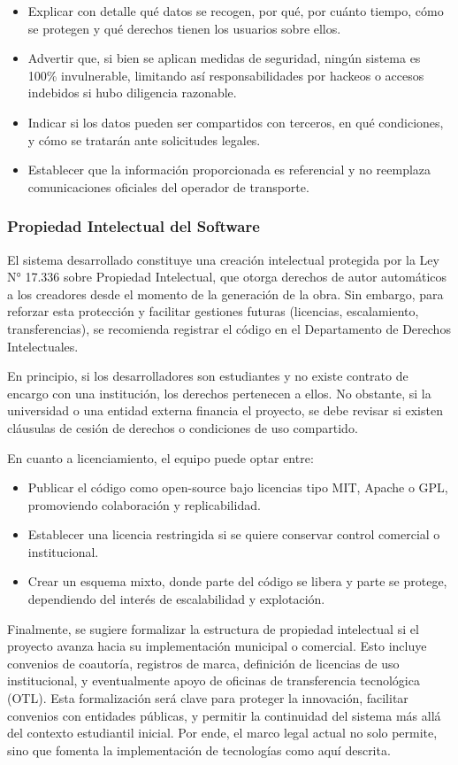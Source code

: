 \documentclass[12pt]{article}
\begin{document}
\begin{itemize}
    \item Explicar con detalle qué datos se recogen, por qué, por cuánto tiempo, cómo se protegen y qué derechos tienen los usuarios sobre ellos.
    \item Advertir que, si bien se aplican medidas de seguridad, ningún sistema es 100\% invulnerable, limitando así responsabilidades por hackeos o accesos indebidos si hubo diligencia razonable.
    \item Indicar si los datos pueden ser compartidos con terceros, en qué condiciones, y cómo se tratarán ante solicitudes legales.
    \item Establecer que la información proporcionada es referencial y no reemplaza comunicaciones oficiales del operador de transporte.\\ 


\end{itemize}
\subsubsection{Propiedad Intelectual del Software}

El sistema desarrollado constituye una creación intelectual protegida por la Ley N° 17.336 sobre Propiedad Intelectual, que otorga derechos de autor automáticos a los creadores desde el momento de la generación de la obra. Sin embargo, para reforzar esta protección y facilitar gestiones futuras (licencias, escalamiento, transferencias), se recomienda registrar el código en el Departamento de Derechos Intelectuales.

En principio, si los desarrolladores son estudiantes y no existe contrato de encargo con una institución, los derechos pertenecen a ellos. No obstante, si la universidad o una entidad externa financia el proyecto, se debe revisar si existen cláusulas de cesión de derechos o condiciones de uso compartido.

En cuanto a licenciamiento, el equipo puede optar entre:

\begin{itemize}
    \item Publicar el código como open-source bajo licencias tipo MIT, Apache o GPL, promoviendo colaboración y replicabilidad.
    \item Establecer una licencia restringida si se quiere conservar control comercial o institucional.
    \item Crear un esquema mixto, donde parte del código se libera y parte se protege, dependiendo del interés de escalabilidad y explotación.
\end{itemize}
Finalmente, se sugiere formalizar la estructura de propiedad intelectual si el proyecto avanza hacia su implementación municipal o comercial. Esto incluye convenios de coautoría, registros de marca, definición de licencias de uso institucional, y eventualmente apoyo de oficinas de transferencia tecnológica (OTL). Esta formalización será clave para proteger la innovación, facilitar convenios con entidades públicas, y permitir la continuidad del sistema más allá del contexto estudiantil inicial. Por ende, el marco legal actual no solo permite, sino que fomenta la implementación de tecnologías como aquí descrita.
\end{document}
